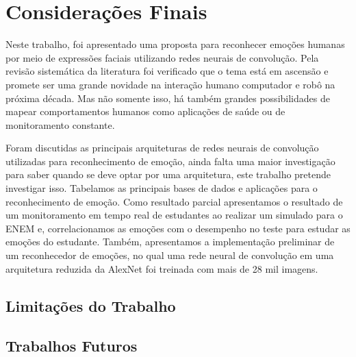 \chapter{Considerações Finais}\label{sec:conclusao}
Neste trabalho, foi apresentado uma proposta para reconhecer emoções humanas por meio de expressões faciais utilizando redes neurais de convolução. Pela revisão sistemática da literatura foi verificado que o tema está em ascensão e promete ser uma grande novidade na interação humano computador e robô na próxima década. Mas não somente isso, há também grandes possibilidades de mapear comportamentos humanos como aplicações de saúde ou de monitoramento constante. 

Foram discutidas as principais arquiteturas de redes neurais de convolução utilizadas para reconhecimento de emoção, ainda falta uma maior investigação para saber quando se deve optar por uma arquitetura, este trabalho pretende investigar isso. Tabelamos as principais bases de dados e aplicações para o reconhecimento de emoção. Como resultado parcial apresentamos o resultado de um monitoramento em tempo real de estudantes ao realizar um simulado para o ENEM e, correlacionamos as emoções com o desempenho no teste para estudar as emoções do estudante. Também, apresentamos a implementação preliminar de um reconhecedor de emoções, no qual uma rede neural de convolução em uma arquitetura reduzida da AlexNet foi treinada com mais de 28 mil imagens.  


\section{Limitações do Trabalho}

\section{Trabalhos Futuros}


% 
